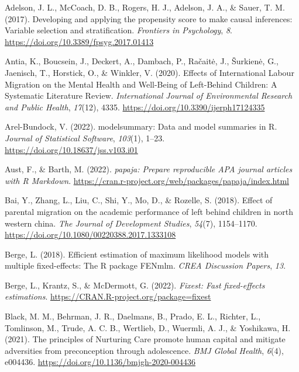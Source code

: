 \documentclass[
  man,floatsintext]{apa7}
\newlength{\cslhangindent}
\newlength{\cslentryspacingunit} %
\newenvironment{CSLReferences}[2] %
 {%
  \setlength{\parindent}{0pt}
  \ifodd #1
  \let\oldpar\par
  \def\par{\hangindent=\cslhangindent\oldpar}
  \fi
  \setlength{\parskip}{#2\cslentryspacingunit}
 }%
 {}
\begin{document}
\hypertarget{refs}{}
\begin{CSLReferences}{1}{0}
\leavevmode{}%
Adelson, J. L., McCoach, D. B., Rogers, H. J., Adelson, J. A., \& Sauer, T. M. (2017). Developing and applying the propensity score to make causal inferences: Variable selection and stratification. \emph{Frontiers in Psychology}, \emph{8}. \url{https://doi.org/10.3389/fpsyg.2017.01413}

\leavevmode{}%
Antia, K., Boucsein, J., Deckert, A., Dambach, P., Račaitė, J., Šurkienė, G., Jaenisch, T., Horstick, O., \& Winkler, V. (2020). Effects of International Labour Migration on the Mental Health and Well-Being of Left-Behind Children: A Systematic Literature Review. \emph{International Journal of Environmental Research and Public Health}, \emph{17}(12), 4335. \url{https://doi.org/10.3390/ijerph17124335}

\leavevmode{}%
Arel-Bundock, V. (2022). {modelsummary}: Data and model summaries in {R}. \emph{Journal of Statistical Software}, \emph{103}(1), 1--23. \url{https://doi.org/10.18637/jss.v103.i01}

\leavevmode{}%
Aust, F., \& Barth, M. (2022). \emph{{papaja}: {Prepare} reproducible {APA} journal articles with {R Markdown}}. \url{https://cran.r-project.org/web/packages/papaja/index.html}

\leavevmode{}%
Bai, Y., Zhang, L., Liu, C., Shi, Y., Mo, D., \& Rozelle, S. (2018). Effect of parental migration on the academic performance of left behind children in north western china. \emph{The Journal of Development Studies}, \emph{54}(7), 1154--1170. \url{https://doi.org/10.1080/00220388.2017.1333108}

\leavevmode{}%
Berge, L. (2018). Efficient estimation of maximum likelihood models with multiple fixed-effects: The {R} package {FENmlm}. \emph{CREA Discussion Papers}, \emph{13}.

\leavevmode{}%
Berge, L., Krantz, S., \& McDermott, G. (2022). \emph{Fixest: Fast fixed-effects estimations}. \url{https://CRAN.R-project.org/package=fixest}

\leavevmode{}%
Black, M. M., Behrman, J. R., Daelmans, B., Prado, E. L., Richter, L., Tomlinson, M., Trude, A. C. B., Wertlieb, D., Wuermli, A. J., \& Yoshikawa, H. (2021). The principles of Nurturing Care promote human capital and mitigate adversities from preconception through adolescence. \emph{BMJ Global Health}, \emph{6}(4), e004436. \url{https://doi.org/10.1136/bmjgh-2020-004436}


\end{CSLReferences}
\end{document}
